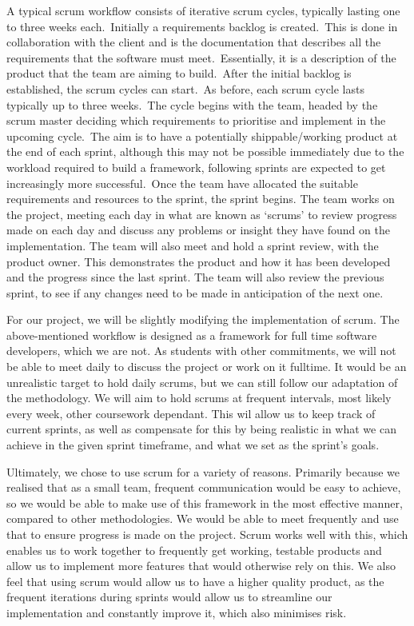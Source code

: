     A typical scrum workflow consists of iterative scrum cycles, typically lasting one to three weeks each.\ Initially a
    requirements backlog is created.\ This is done in collaboration with the client and is the documentation that
    describes all the requirements that the software must meet.\ Essentially, it is a description of the product that the
    team are aiming to build.\ After the initial backlog is established, the scrum cycles can start.\ As before, each
    scrum cycle lasts typically up to three weeks.\ The cycle begins with the team, headed by the scrum master deciding
    which requirements to prioritise and implement in the upcoming cycle.\ The aim is to have a potentially
    shippable/working product at the end of each sprint, although this may not be possible immediately due to the
    workload required to build a framework, following sprints are expected to get increasingly more successful.\ Once the
    team have allocated the suitable requirements and resources to the sprint, the sprint begins. The team works on the
    project, meeting each day in what are known as ‘scrums’ to review progress made on each day and discuss any problems
    or insight they have found on the implementation. The team will also meet and hold a sprint review, with the product
    owner. This demonstrates the product and how it has been developed and the progress since the last sprint. The team
    will also review the previous sprint, to see if any changes need to be made in anticipation of the next
    one.\cite{nuevo_2011_scrumbased}

    For our project, we will be slightly modifying the implementation of scrum. The above-mentioned workflow is designed
    as a framework for full time software developers, which we are not. As students with other commitments, we will not
    be able to meet daily to discuss the project or work on it fulltime. It would be an unrealistic target to hold daily
    scrums, but we can still follow our adaptation of the methodology. We will aim to hold scrums at frequent intervals,
    most likely every week, other coursework dependant. This wil allow us to keep track of current sprints, as well as
    compensate for this by being realistic in what we can achieve in the given sprint timeframe, and what we set as the
    sprint’s goals.

    Ultimately, we chose to use scrum for a variety of reasons. Primarily because we realised that as a small team,
    frequent communication would be easy to achieve, so we would be able to make use of this framework in the most
    effective manner, compared to other methodologies. We would be able to meet frequently and use that to ensure
    progress is made on the project. Scrum works well with this, which enables us to work together to frequently get
    working, testable products and allow us to implement more features that would otherwise rely on this. We also feel
    that using scrum would allow us to have a higher quality product, as the frequent iterations during sprints would
    allow us to streamline our implementation and constantly improve it, which also minimises risk.

